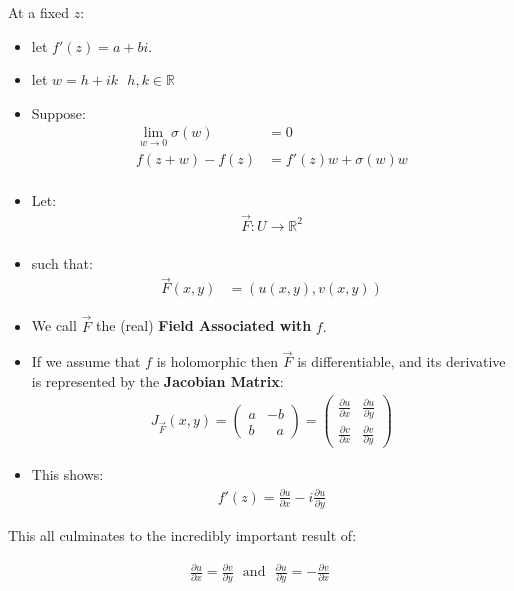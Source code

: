 At a fixed $z$: 
\begin{itemize}
	\item let $f'(z) = a + bi.$ \\
	\item let $w = h + ik \,\,\,\, h, k \in \mathbb{R}$
	\item Suppose:
	\begin{align*}
		\lim_{w \to 0} \sigma(w) &= 0 \\
		f(z + w) - f(z) &= f'(z)w + \sigma(w)w \\
	\end{align*}
	\item Let:
	\begin{align*}
		\vec{F}: U \to \mathbb{R}^2 \\
	\end{align*}
	\item such that:
	\begin{align*}
		\vec{F}(x, y) &= (u(x, y), v(x, y))
	\end{align*}
\end{itemize}

\begin{itemize}
		\item We call $\vec{F}$ the (real) \textbf{Field Associated with} $f.$ 
		\item If we assume that $f$ is holomorphic then $\vec{F}$ is differentiable, and its derivative is represented by the \textbf{Jacobian Matrix}:
		\begin{align*}
			J_{\vec{F}}(x, y) = \left( \begin{matrix}
				a & -b \\
				b &\,\,\,\,  a 
			\end{matrix}
			\right)
			= \left( \begin{matrix}
				\frac{\partial u}{\partial x} & \frac{\partial u}{\partial y} \\
				\frac{\partial v}{\partial x} & \frac{\partial v}{\partial y}
			\end{matrix} \right)
		\end{align*}
		\item This shows:
		\begin{align*}
			f'(z) = \frac{\partial u}{\partial x} - i\frac{\partial u}{\partial y}
		\end{align*}
\end{itemize}
This all culminates to the incredibly important result of:
\begin{defn}
	\begin{align*}
		\frac{\partial u}{\partial x} = \frac{\partial v}{\partial y} \,\,\,\, \text{and} \,\,\,\, \frac{\partial u}{\partial y} = -\frac{\partial v}{\partial x}
	\end{align*}	
\end{defn}


